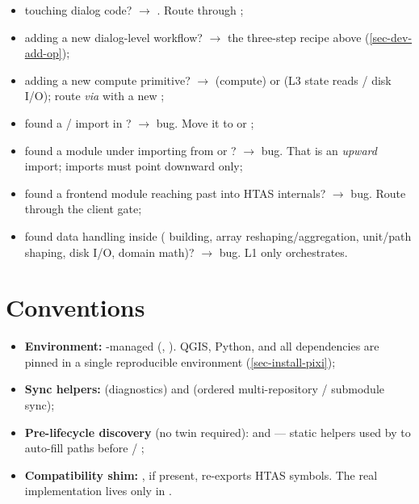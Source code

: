 \begin{itemize}
    \item touching dialog code? $\rightarrow$ . Route through ;
    \item adding a new dialog-level workflow? $\rightarrow$ the three-step recipe above (\cref{sec-dev-add-op});
    \item adding a new compute primitive? $\rightarrow$  (compute) or  (L3 state reads / disk I/O); route \textit{via}  with a new ;
    \item found a  /  import in ? $\rightarrow$ bug. Move it to  or ;
    \item found a module under  importing from  or ? $\rightarrow$ bug. That is an \emph{upward} import; imports must point downward only;
    \item found a frontend module reaching past  into HTAS internals? $\rightarrow$ bug. Route through the client gate;
    \item found data handling inside  ( building, array reshaping/aggregation, unit/path shaping, disk I/O, domain math)? $\rightarrow$ bug. L1 only orchestrates.
\end{itemize}

\section{Conventions}
\label{sec-dev-conventions}

\begin{itemize}
    \item \textbf{Environment:} -managed (, ). QGIS, Python, and all dependencies are pinned in a single reproducible environment (\cref{sec-install-pixi});
    \item \textbf{Sync helpers:}  (diagnostics) and  (ordered multi-repository / submodule sync);
    \item \textbf{Pre-lifecycle discovery} (no twin required):  and  --- static helpers used by  to auto-fill paths before  / ;
    \item \textbf{Compatibility shim:} , if present, re-exports HTAS symbols. The real implementation lives only in .
\end{itemize}

